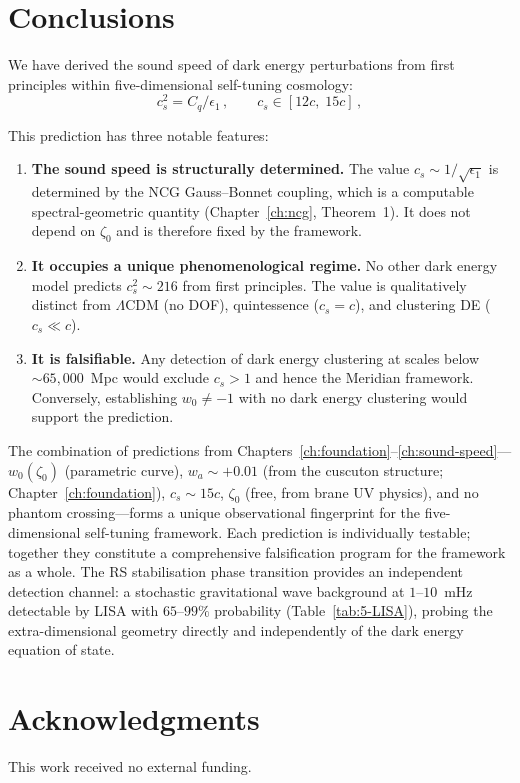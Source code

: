 \section{Conclusions}
\label{sec:5-conclusions}

We have derived the sound speed of dark energy perturbations from first principles within five-dimensional self-tuning cosmology:
\begin{equation}
  \boxed{c_s^2 = C_q/\epsilon_1\,,\qquad c_s \in [12c,\; 15c]\,,}
  \label{eq:5-30}
\end{equation}

This prediction has three notable features:

\begin{enumerate}
\item \textbf{The sound speed is structurally determined.} The value $c_s \sim 1/\sqrt{\epsilon_1}$ is determined by the NCG Gauss--Bonnet coupling, which is a computable spectral-geometric quantity (Chapter~\ref{ch:ncg}, Theorem~1). It does not depend on $\zeta_0$ and is therefore fixed by the framework.

\item \textbf{It occupies a unique phenomenological regime.} No other dark energy model predicts $c_s^2 \sim 216$ from first principles. The value is qualitatively distinct from $\Lambda$CDM (no DOF), quintessence ($c_s = c$), and clustering DE ($c_s \ll c$).

\item \textbf{It is falsifiable.} Any detection of dark energy clustering at scales below ${\sim}65{,}000$~Mpc would exclude $c_s > 1$ and hence the Meridian framework. Conversely, establishing $w_0 \neq -1$ with no dark energy clustering would support the prediction.
\end{enumerate}

The combination of predictions from Chapters~\ref{ch:foundation}--\ref{ch:sound-speed}---$w_0(\zeta_0)$ (parametric curve), $w_a \sim +0.01$ (from the cuscuton structure; Chapter~\ref{ch:foundation}), $c_s \sim 15c$, $\zeta_0$ (free, from brane UV physics), and no phantom crossing---forms a unique observational fingerprint for the five-dimensional self-tuning framework. Each prediction is individually testable; together they constitute a comprehensive falsification program for the framework as a whole. The RS stabilisation phase transition provides an independent detection channel: a stochastic gravitational wave background at $1$--$10$~mHz detectable by LISA with $65$--$99\%$ probability (Table~\ref{tab:5-LISA}), probing the extra-dimensional geometry directly and independently of the dark energy equation of state.

\section*{Acknowledgments}

This work received no external funding.


